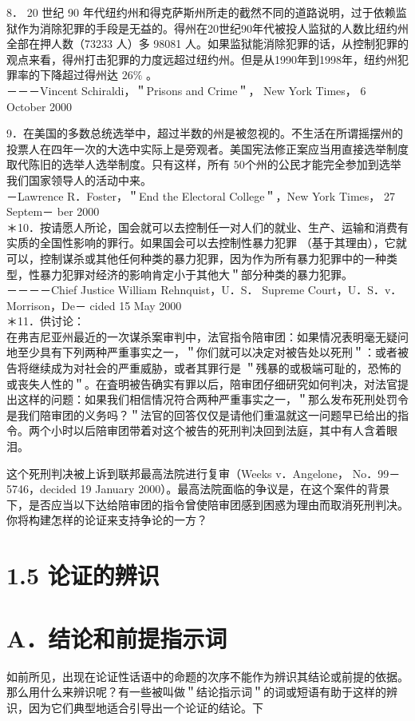 8． 20 世纪 90 年代纽约州和得克萨斯州所走的截然不同的道路说明，过于依赖监狱作为消除犯罪的手段是无益的。得州在20世纪90年代被投人监狱的人数比纽约州全部在押人数（73233 人）多 98081 人。如果监狱能消除犯罪的话，从控制犯罪的观点来看，得州打击犯罪的力度远超过纽约州。但是从1990年到1998年，纽约州犯罪率的下降超过得州达 $26 \%$ 。\\
－－－Vincent Schiraldi，＂Prisons and Crime＂， New York Times， 6 October 2000

9．在美国的多数总统选举中，超过半数的州是被忽视的。不生活在所谓摇摆州的投票人在四年一次的大选中实际上是旁观者。美国宪法修正案应当用直接选举制度取代陈旧的选举人选举制度。只有这样，所有 50个州的公民才能完全参加到选举我们国家领导人的活动中来。\\
－Lawrence R．Foster，＂End the Electoral College＂，New York Times， 27 Septem－ ber 2000\\
＊10．按请愿人所论，国会就可以去控制任一对人们的就业、生产、运输和消费有实质的全国性影响的罪行。如果国会可以去控制性暴力犯罪 （基于其理由），它就可以，控制谋杀或其他任何种类的暴力犯罪，因为作为所有暴力犯罪中的一种类型，性暴力犯罪对经济的影响肯定小于其他大＂部分种类的暴力犯罪。\\
－－－－Chief Justice William Rehnquist，U．S． Supreme Court，U．S．v．Morrison，De－ cided 15 May 2000\\
＊11．供讨论：\\
在弗吉尼亚州最近的一次谋杀案审判中，法官指令陪审团：如果情况表明毫无疑问地至少具有下列两种严重事实之一，＂你们就可以决定对被告处以死刑＂：或者被告将继续成为对社会的严重威胁，或者其罪行是 ＂残暴的或极端可耻的，恐怖的或丧失人性的＂。在査明被告确实有罪以后，陪审团仔细研究如何判决，对法官提出这样的问题：如果我们相信情况符合两种严重事实之一，＂那么发布死刑处罚令是我们陪审团的义务吗？＂法官的回答仅仅是请他们重温就这一问题早已给出的指令。两个小时以后陪审团带着对这个被告的死刑判决回到法庭，其中有人含着眼泪。

这个死刑判决被上诉到联邦最高法院进行复审（Weeks v．Angelone， No．99－5746，decided 19 January 2000）。最高法院面临的争议是，在这个案件的背景下，是否应当以下达给陪审团的指令曾使陪审团感到困惑为理由而取消死刑判决。你将构建怎样的论证来支持争论的一方？

\section*{1.5 论证的辨识}
\section*{A．结论和前提指示词}
如前所见，出现在论证性话语中的命题的次序不能作为辨识其结论或前提的依据。那么用什么来辨识呢？有一些被叫做＂结论指示词＂的词或短语有助于这样的辨识，因为它们典型地适合引导出一个论证的结论。下

